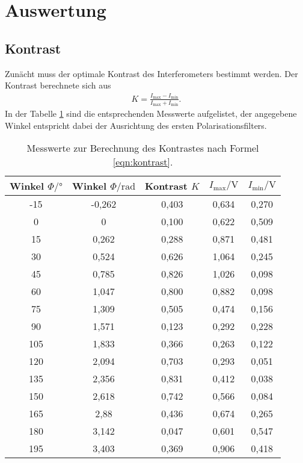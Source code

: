 \section{Auswertung}
\label{sec:Auswertung}
\subsection{Kontrast}
\label{sec:Kontrast}
Zunächt muss der optimale Kontrast des Interferometers bestimmt
werden.
Der Kontrast berechnete sich aus
\begin{align}
K=\frac{I_\mathrm{max}-I_\mathrm{min}}{I_\mathrm{max}+I_\mathrm{min}}\label{eqn:kontrast}.
\end{align}
In der Tabelle \ref{tab:kontrast}
sind die entsprechenden Messwerte aufgelistet, der angegebene Winkel
entspricht dabei der Ausrichtung des ersten Polarisationsfilters.
\begin{table}
\centering
\caption{Messwerte zur Berechnung des Kontrastes nach Formel \eqref{eqn:kontrast}.}
\label{tab:kontrast}
\begin{tabular}{c c c c c}
\toprule
   Winkel $\Phi/\si{\degree}$&   Winkel $\Phi/\si{\radian}$ &  Kontrast $K$ &   $I_\mathrm{max}/\si{\volt}$ &    $I_\mathrm{min}/\si{\volt}$ \\
\midrule
    -15 &   -0,262 &      0,403 &   0,634 &    0,270 \\
      0 &    0     &      0,100 &   0,622 &    0,509 \\
     15 &    0,262 &      0,288 &   0,871 &    0,481 \\
     30 &    0,524 &      0,626 &   1,064 &    0,245 \\
     45 &    0,785 &      0,826 &   1,026 &    0,098 \\
     60 &    1,047 &      0,800 &   0,882 &    0,098 \\
     75 &    1,309 &      0,505 &   0,474 &    0,156 \\
     90 &    1,571 &      0,123 &   0,292 &    0,228 \\
    105 &    1,833 &      0,366 &   0,263 &    0,122 \\
    120 &    2,094 &      0,703 &   0,293 &    0,051 \\
    135 &    2,356 &      0,831 &   0,412 &    0,038 \\
    150 &    2,618 &      0,742 &   0,566 &    0,084 \\
    165 &    2,88  &      0,436 &   0,674 &    0,265 \\
    180 &    3,142 &      0,047 &   0,601 &    0,547 \\
    195 &    3,403 &      0,369 &   0,906 &    0,418 \\
\bottomrule
\end{tabular}
\end{table}

